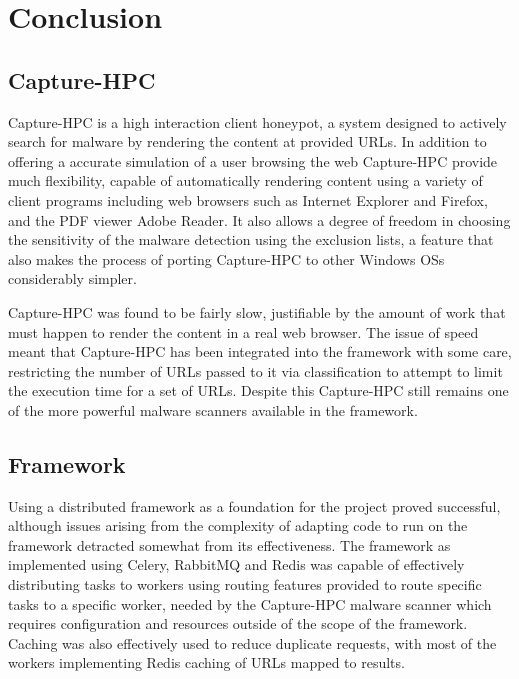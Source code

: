 \section{Conclusion} 
 


\subsection{Capture-HPC}

Capture-HPC is a high interaction client honeypot, a system designed to actively
search for malware by rendering the content at provided URLs. In addition to
offering a accurate simulation of a user browsing the web Capture-HPC provide
much flexibility, capable of automatically rendering content using a variety of
client programs including web browsers such as Internet Explorer and Firefox,
and the PDF viewer Adobe Reader. It also allows a degree of freedom in choosing
the sensitivity of the malware detection using the exclusion lists, a feature
that also makes the process of porting Capture-HPC to other Windows OSs
considerably simpler.

Capture-HPC was found to be fairly slow, justifiable by the amount of work that
must happen to render the content in a real web browser. The issue of speed
meant that Capture-HPC has been integrated into the framework with some care,
restricting the number of URLs passed to it via classification to attempt to
limit the execution time for a set of URLs. Despite this Capture-HPC still 
remains one of the more powerful malware scanners available in the framework.

\subsection{Framework}

Using a distributed framework as a foundation for the project proved successful,
although issues arising from the complexity of adapting code to run on the
framework detracted somewhat from its effectiveness. The framework as
implemented using Celery, RabbitMQ and Redis was capable of effectively
distributing tasks to workers using routing features provided to route specific
tasks to a specific worker, needed by the Capture-HPC malware scanner which
requires configuration and resources outside of the scope of the framework.
Caching was also effectively used to reduce duplicate requests, with most of the
workers implementing Redis caching of URLs mapped to results.

